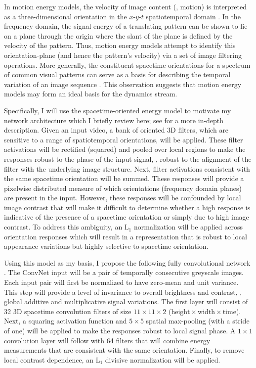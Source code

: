 In motion energy models, the velocity of image content (\ie, motion)
is interpreted as a three-dimensional orientation in the $x$-$y$-$t$
spatiotemporal domain
\cite{adelson1985spatiotemporal,fahle1981,heeger1988,simoncelli1998,watson1983}.
In the frequency domain, the signal energy of a translating
pattern can be shown to lie on a plane through the origin
where the slant of the plane is defined by the velocity of
the pattern.
Thus, motion energy models attempt to identify this 
orientation-plane (and hence the pattern's velocity) via
a set of image filtering operations.
More generally,
the constituent
spacetime orientations for a spectrum of common
visual patterns can serve as a basis for describing the temporal
variation of an image sequence \cite{derpanis2012spacetime}.
This observation suggests that motion energy models may form an
ideal basis for the dynamics stream.

Specifically, I will use the spacetime-oriented energy model
\cite{derpanis2012spacetime,simoncelli1998} to motivate my
network architecture which I briefly review here; 
see \cite{derpanis2012spacetime} for a more in-depth 
description.
Given an input video, 
a bank of oriented 3D
filters, which are sensitive to a range of
spatiotemporal orientations, will be applied.
These filter activations will be rectified (squared) and
pooled over local regions to make the responses robust
to the phase of the input signal, \ie, robust to the
alignment of the filter with the underlying image
structure.
Next, filter activations consistent with the same spacetime
orientation will be summed.
These responses will provide a pixelwise distributed measure
of which orientations (frequency domain planes) are
present in the input.
However, these responses will be confounded by local image
contrast that will make
it difficult to determine
whether a high response is indicative of the presence of
a spacetime orientation or simply due to high image
contrast.
To address this ambiguity, an $\textrm{L}_1$
normalization will be applied across orientation responses which will
result in a representation that is robust to local
appearance variations but highly selective to 
spacetime orientation.

Using this model as my basis, I propose the following 
fully convolutional 
network
\cite{shelhamer2017}.
The ConvNet input will be a pair of temporally consecutive greyscale images.
Each input pair will first be normalized to have zero-mean and unit
variance.
This step will provide a level of invariance to overall
brightness and contrast, \ie, global additive and
multiplicative signal variations.
The first layer will consist of 32 3D spacetime convolution
filters of size $11\times 11 \times 2$
($\text{height} \times \text{width} \times \text{time}$).
Next, a squaring activation function and $5 \times 5$
spatial max-pooling (with a stride of one) will be applied to
make the responses robust to local signal phase.
A $1\times 1$
convolution layer will follow with 64 filters that will combine
energy measurements that are consistent
with the same orientation.
Finally, to remove local contrast dependence, an
$\text{L}_1$ divisive normalization will be applied.

